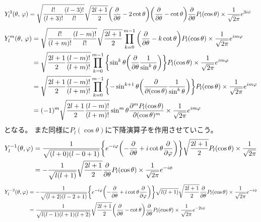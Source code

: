 \documentclass[../master.tex]{subfiles}
\begin{document}
\begin{equation}\begin{aligned}[b]
    Y_l^3(\theta,\,\varphi)
	 & =\sqrt{\frac{l!}{(l+3)!}\frac{(l-3)!}{l!}}\sqrt{\frac{2l+1}{2}}\qty(\pdv{\theta}-2\cot\theta)\qty(\pdv{\theta}-\cot\theta)\pdv{\theta}P_l(\cos\theta)\times\frac{1}{\sqrt{2\pi}}e^{3i\phi}
\end{aligned}\end{equation}
\begin{equation}\begin{aligned}[b]
    Y_l^m(\theta,\,\varphi)
	 & =\sqrt{\frac{l!}{(l+m)!}\frac{(l-m)!}{l!}}\sqrt{\frac{2l+1}{2}} \prod_{k=0}^{m-1}\qty(\pdv{\theta}-k\cot\theta)P_l(\cos\theta)\times\frac{1}{\sqrt{2\pi}}e^{im\varphi}                    \\
	 & =\sqrt{\frac{2l+1}{2}\frac{(l-m)!}{(l+m)!}} \prod_{k=0}^{m-1}\qty{\sin^k\theta\qty(\pdv{\theta}\frac{1}{\sin^k\theta})}P_l(\cos\theta)\times\frac{1}{\sqrt{2\pi}}e^{im\varphi}            \\
	 & =\sqrt{\frac{2l+1}{2}\frac{(l-m)!}{(l+m)!}} \prod_{k=0}^{m-1}\qty{-\sin^{k+1}\theta\qty(\pdv{(\cos\theta)}\frac{1}{\sin^k\theta})}P_l(\cos\theta)\times\frac{1}{\sqrt{2\pi}}e^{im\varphi} \\
	 & =(-1)^m\sqrt{\frac{2l+1}{2}\frac{(l-m)!}{(l+m)!}} \sin^{m}\theta\pdv[m]{P_l(\cos\theta)}{(\cos\theta)}\times\frac{1}{\sqrt{2\pi}}e^{im\varphi}
\end{aligned}\end{equation}
となる。
また同様に\(P_l(\cos\theta)\)に下降演算子を作用させていこう。
\begin{equation}\begin{aligned}[b]
    Y_l^{-1}(\theta,\varphi)
	 & = \frac{1}{\sqrt{(l+0)(l-0+1)}}\qty{e^{-i\varphi}\qty(-\pdv{\theta}+i\cot\theta\pdv{\varphi})}\sqrt{\frac{2l+1}{2}}P_l(\cos\theta)\times\frac{1}{\sqrt{2\pi}} \\
	 & =	-\frac{1}{\sqrt{l(l+1)}}\sqrt{\frac{2l+1}{2}}\pdv{\theta}P_l(\cos\theta)\times\frac{1}{\sqrt{2\pi}}e^{-i\phi}
\end{aligned}\end{equation}
\begin{equation}\begin{aligned}[b]
    Y_l^{-2}(\theta,\varphi)
	 & =-\frac{1}{\sqrt{(l+2)(l-2+1)}}\qty{e^{-i\varphi}\qty(-\pdv{\theta}+i\cot\theta\pdv{\varphi})}\sqrt{l(l+1)}\sqrt{\frac{2l+1}{2}}\pdv{\theta}P_l(\cos\theta)\times\frac{1}{\sqrt{2\pi}}e^{-i\phi} \\
	 & =\frac{1}{\sqrt{l(l-1)(l+1)(l+2)}}\sqrt{\frac{2l+1}{2}}\qty(\pdv{\theta}-\cot\theta)\pdv{\theta}P_l(\cos\theta)\times\frac{1}{\sqrt{2\pi}}e^{-2i\phi}
\end{aligned}\end{equation}
\end{document}
